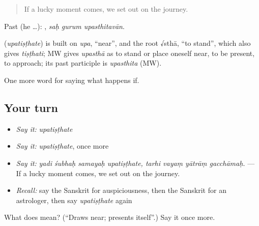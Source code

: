 \begin{quote}
If a lucky moment comes, we set out on the journey.
\end{quote}

Past (he …):   , \emph{saḥ gurum upasthitavān}.

\begin{cousinweb}
\textbf{} (\emph{upatiṣṭhate}) is built on \emph{upa}, \textquotedblleft{}near\textquotedblright{}, and the root √sthā, \textquotedblleft{}to stand\textquotedblright{}, which also gives \emph{tiṣṭhati}; MW gives \emph{upasthā} as to stand or place oneself near, to be present, to approach; its past participle is \emph{upasthita} (MW).
\end{cousinweb}

\begin{grammarlens}[title={What you've built}]
One more word for saying what happens if.
\end{grammarlens}

\subsection*{Your turn}
\begin{itemize}
\raggedright
  \item \emph{Say it:} \emph{upatiṣṭhate}
  \item \emph{Say it:} \emph{upatiṣṭhate}, once more
  \item \emph{Say it:} \emph{yadi śubhaḥ samayaḥ upatiṣṭhate, tarhi vayaṃ yātrāṃ gacchāmaḥ.} — If a lucky moment comes, we set out on the journey.
  \item \emph{Recall:} say the Sanskrit for auspiciousness, then the Sanskrit for an astrologer, then say \emph{upatiṣṭhate} again
\end{itemize}

\begin{tcolorbox}[breakable,colback=teal!4,colframe=teal!35!black,title={Before you move on}]
What does  mean? (\textquotedblleft{}Draws near; presents itself\textquotedblright{}.) Say it once more.
\end{tcolorbox}
